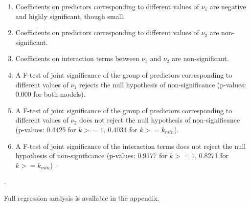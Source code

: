 \begin{enumerate}
\item Coefficients on predictors corresponding to different values of $\nu_1$ are negative and highly significant, though small.
\item Coefficients on predictors corresponding to different values of $\nu_2$ are non-significant.
\item Coefficients on interaction terms between $\nu_1$ and $\nu_2$ are non-significant.
\item A F-test of joint significance of the group of predictors corresponding to different values of $\nu_1$ rejects the null hypothesis of non-significance (p-values: 0.000 for both models). 
\item A F-test of joint significance of the group of predictors corresponding to different values of $\nu_2$ does not reject the null hypothesis of non-significance (p-values:  0.4425 for $k >= 1$,  0.4034 for $k>= k_{min}$).
\item A F-test of joint significance of the interaction terms does not reject the null hypothesis of non-significance (p-values:  0.9177 for $k >= 1$,  0.8271 for $k>= k_{min}$)  .
\end{enumerate}.

Full regression analysis is available in the appendix.

